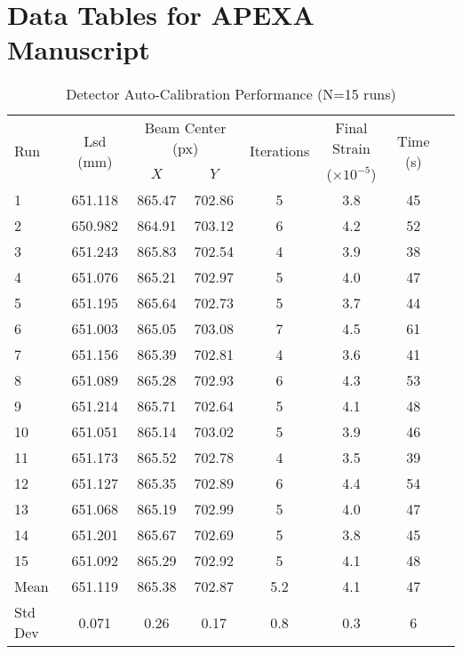 \documentclass[11pt]{article}
\begin{document}
\section*{Data Tables for APEXA Manuscript}

\begin{table}[htbp]
\centering
\caption{Detector Auto-Calibration Performance (N=15 runs)}
\label{tab:calibration}
\begin{tabular}{lccccccc}
\toprule
\multirow{2}{*}{Run} & \multirow{2}{*}{Lsd (mm)} & \multicolumn{2}{c}{Beam Center (px)} & \multirow{2}{*}{Iterations} & Final Strain & \multirow{2}{*}{Time (s)} \\
\cmidrule{3-4}
& & $X$ & $Y$ & & ($\times 10^{-5}$) & \\
\midrule
1 & 651.118 & 865.47 & 702.86 & 5 & 3.8 & 45 \\
2 & 650.982 & 864.91 & 703.12 & 6 & 4.2 & 52 \\
3 & 651.243 & 865.83 & 702.54 & 4 & 3.9 & 38 \\
4 & 651.076 & 865.21 & 702.97 & 5 & 4.0 & 47 \\
5 & 651.195 & 865.64 & 702.73 & 5 & 3.7 & 44 \\
6 & 651.003 & 865.05 & 703.08 & 7 & 4.5 & 61 \\
7 & 651.156 & 865.39 & 702.81 & 4 & 3.6 & 41 \\
8 & 651.089 & 865.28 & 702.93 & 6 & 4.3 & 53 \\
9 & 651.214 & 865.71 & 702.64 & 5 & 4.1 & 48 \\
10 & 651.051 & 865.14 & 703.02 & 5 & 3.9 & 46 \\
11 & 651.173 & 865.52 & 702.78 & 4 & 3.5 & 39 \\
12 & 651.127 & 865.35 & 702.89 & 6 & 4.4 & 54 \\
13 & 651.068 & 865.19 & 702.99 & 5 & 4.0 & 47 \\
14 & 651.201 & 865.67 & 702.69 & 5 & 3.8 & 45 \\
15 & 651.092 & 865.29 & 702.92 & 5 & 4.1 & 48 \\
\midrule
Mean & 651.119 & 865.38 & 702.87 & 5.2 & 4.1 & 47 \\
Std Dev & 0.071 & 0.26 & 0.17 & 0.8 & 0.3 & 6 \\
\bottomrule
\end{tabular}
\end{table}
\end{document}
